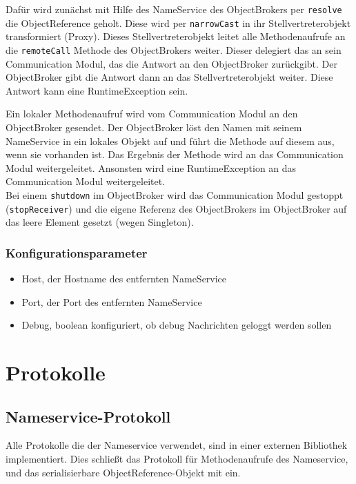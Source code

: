 \documentclass{article}
\begin{document}
Dafür wird zunächst mit Hilfe des NameService des ObjectBrokers per \texttt{resolve} die ObjectReference geholt. Diese
wird per \texttt{narrowCast} in ihr Stellvertreterobjekt transformiert (Proxy). Dieses Stellvertreterobjekt leitet alle
Methodenaufrufe an die \texttt{remoteCall} Methode des ObjectBrokers weiter. Dieser delegiert das an sein Communication
Modul, das die Antwort an den ObjectBroker zurückgibt. Der ObjectBroker gibt die Antwort dann an das
Stellvertreterobjekt weiter. Diese Antwort kann eine RuntimeException sein.

Ein lokaler Methodenaufruf wird vom Communication Modul an den ObjectBroker gesendet. Der ObjectBroker löst den Namen
mit seinem NameService in ein lokales Objekt auf und führt die Methode auf diesem aus, wenn sie vorhanden ist. Das
Ergebnis der Methode wird an das Communication Modul weitergeleitet. Ansonsten wird eine RuntimeException an das
Communication Modul weitergeleitet.\\

Bei einem \texttt{shutdown} im ObjectBroker wird das Communication Modul gestoppt (\texttt{stopReceiver}) und die
eigene Referenz des ObjectBrokers im ObjectBroker auf das leere Element gesetzt (wegen Singleton).

\subsubsection{Konfigurationsparameter}

\begin{itemize}
    \item Host, der Hostname des entfernten NameService
    \item Port, der Port des entfernten NameService
	\item Debug, boolean konfiguriert, ob debug Nachrichten geloggt werden sollen
\end{itemize}

\section{Protokolle}
\subsection{Nameservice-Protokoll}
Alle Protokolle die der Nameservice verwendet, sind in einer externen Bibliothek implementiert.
Dies schließt das Protokoll für Methodenaufrufe des Nameservice, und das serialisierbare
ObjectReference-Objekt mit ein.
\end{document}
